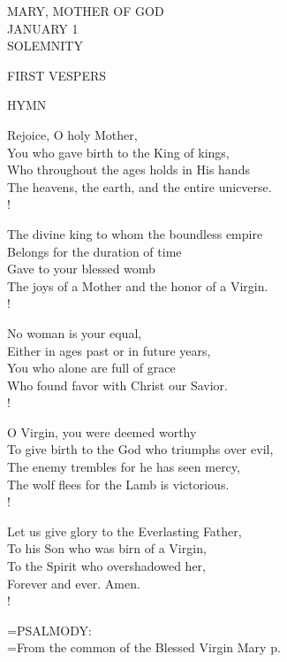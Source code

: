 \begin{center}\normalsize MARY, MOTHER OF GOD\\
\footnotesize JANUARY 1\\
\footnotesize SOLEMNITY\\
\end{center}

\begin{flushleft}\normalsize FIRST VESPERS\\\end{flushleft}

\noindent\small{\uppercase{Hymn }}\normalsize\label{bvm:motherofgod:hymn}
\begin{cverse}
Rejoice, O holy Mother,\\
You who gave birth to the King of kings,\\
Who throughout the ages holds in His hands\\
The heavens, the earth, and the entire unicverse.\\!

The divine king to whom the boundless empire\\
Belongs for the duration of time\\
Gave to your blessed womb\\
The joys of a Mother and the honor of a Virgin.\\!

No woman is your equal,\\
Either in ages past or in future years,\\
You who alone are full of grace\\
Who found favor with Christ our Savior.\\!

O Virgin, you were deemed worthy\\
To give birth to the God who triumphs over evil,\\
The enemy trembles for he has seen mercy,\\
The wolf flees for the Lamb is victorious.\\!

Let us give glory to the Everlasting Father,\\
To his Son who was birn of a Virgin,\\
To the Spirit who overshadowed her,\\
Forever and ever. Amen.\\!
\end{cverse}

\hangindent=\parindent \small{PSALMODY:}\\
\hangindent=\parindent  From the common of the Blessed Virgin Mary p. \pageref{common:bvm:firstVespers}\vspace{0.5em}

